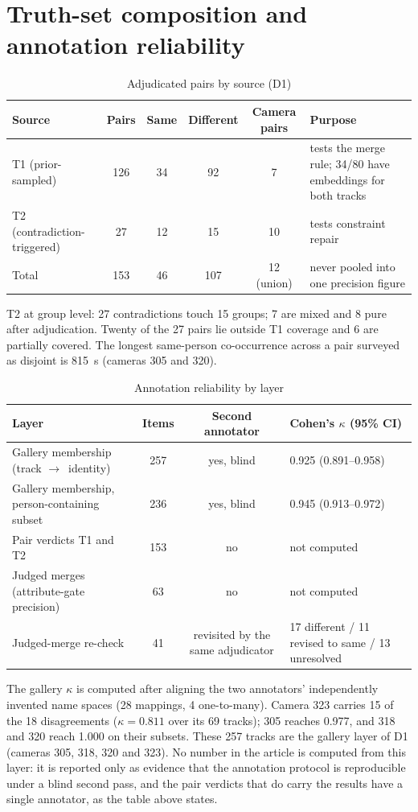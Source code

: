 \documentclass[10pt,a4paper]{article}
\newcommand{\ra}{$\rightarrow$}
\begin{document}
\section{Truth-set composition and annotation reliability}
\begin{table}[h]\centering
\caption{Adjudicated pairs by source (D1)}
\begin{tabular}{@{}lccccp{5cm}@{}}
\toprule
Source & Pairs & Same & Different & Camera pairs & Purpose\\
\midrule
T1 (prior-sampled) & 126 & 34 & 92 & 7 & tests the merge rule; 34/80 have embeddings for both tracks\\
T2 (contradiction-triggered) & 27 & 12 & 15 & 10 & tests constraint repair\\
Total & 153 & 46 & 107 & 12 (union) & never pooled into one precision figure\\
\bottomrule
\end{tabular}
\end{table}

T2 at group level: 27 contradictions touch 15 groups; 7 are mixed and 8 pure after adjudication. Twenty of the 27 pairs lie outside T1 coverage and 6 are partially covered. The longest same-person co-occurrence across a pair surveyed as disjoint is 815~s (cameras 305 and 320).

\begin{table}[h]\centering
\caption{Annotation reliability by layer}
\begin{tabular}{@{}lccp{3.5cm}@{}}
\toprule
Layer & Items & Second annotator & Cohen's $\kappa$ (95\% CI)\\
\midrule
Gallery membership (track \ra\ identity) & 257 & yes, blind & 0.925 (0.891--0.958)\\
Gallery membership, person-containing subset & 236 & yes, blind & 0.945 (0.913--0.972)\\
Pair verdicts T1 and T2 & 153 & no & not computed\\
Judged merges (attribute-gate precision) & 63 & no & not computed\\
Judged-merge re-check & 41 & revisited by the same adjudicator & 17 different / 11 revised to same / 13 unresolved\\
\bottomrule
\end{tabular}
\end{table}

The gallery $\kappa$ is computed after aligning the two annotators' independently invented name spaces (28 mappings, 4 one-to-many). Camera 323 carries 15 of the 18 disagreements ($\kappa = 0.811$ over its 69 tracks); 305 reaches 0.977, and 318 and 320 reach 1.000 on their subsets. These 257 tracks are the gallery layer of D1 (cameras 305, 318, 320 and 323). No number in the article is computed from this layer: it is reported only as evidence that the annotation protocol is reproducible under a blind second pass, and the pair verdicts that do carry the results have a single annotator, as the table above states.
\end{document}
